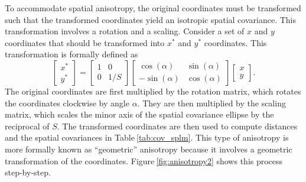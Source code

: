 \documentclass{article}
\begin{document}
To accommodate spatial anisotropy, the original coordinates must be
transformed such that the transformed coordinates yield an isotropic
spatial covariance. This transformation involves a rotation and a
scaling. Consider a set of \(x\) and \(y\) coordinates that should be
transformed into \(x^*\) and \(y^*\) coordinates. This transformation is
formally defined as \begin{equation*}
  \begin{bmatrix}
    x^* \\
    y^*
  \end{bmatrix} = 
  \begin{bmatrix}
    1 & 0 \\
    0 & 1 / S
  \end{bmatrix}
  \begin{bmatrix}
    \cos(\alpha) & \sin(\alpha) \\
    -\sin(\alpha) & \cos(\alpha)
  \end{bmatrix}  
  \begin{bmatrix}
    x \\
    y
  \end{bmatrix}.
\end{equation*} The original coordinates are first multiplied by the
rotation matrix, which rotates the coordinates clockwise by angle
\(\alpha\). They are then multiplied by the scaling matrix, which scales
the minor axis of the spatial covariance ellipse by the reciprocal of
\(S\). The transformed coordinates are then used to compute distances
and the spatial covariances in Table\(~\)\ref{tab:cov_splm}. This type
of anisotropy is more formally known as ``geometric'' anisotropy because
it involves a geometric transformation of the coordinates.
Figure\(~\)\ref{fig:anisotropy2} shows this process step-by-step.
\end{document}
